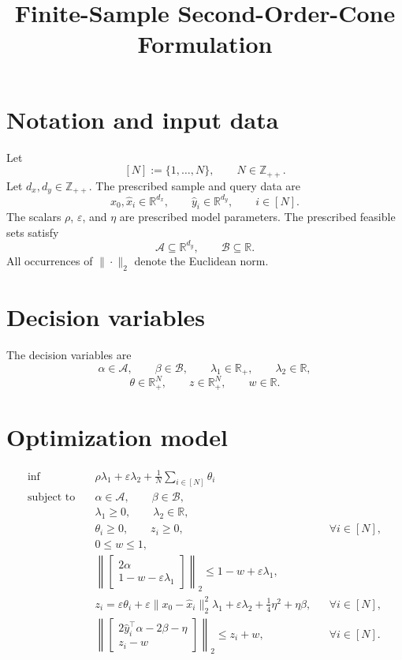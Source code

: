 \documentclass[11pt]{article}
\title{Finite-Sample Second-Order-Cone Formulation}
\author{}
\date{}
\begin{document}
\maketitle

\section*{Notation and input data}
Let
\[
[N] := \{1,\ldots,N\},
\qquad N\in\mathbb{Z}_{++}.
\]
Let $d_x,d_y\in\mathbb{Z}_{++}$. The prescribed sample and query data are
\[
x_0,\widehat{x}_i\in\mathbb{R}^{d_x},
\qquad
\widehat{y}_i\in\mathbb{R}^{d_y},
\qquad i\in[N].
\]
The scalars $\rho$, $\varepsilon$, and $\eta$ are prescribed model parameters. The prescribed feasible sets satisfy
\[
\mathcal{A}\subseteq\mathbb{R}^{d_y},
\qquad
\mathcal{B}\subseteq\mathbb{R}.
\]
All occurrences of $\|\cdot\|_2$ denote the Euclidean norm.

\section*{Decision variables}
The decision variables are
\[
\alpha\in\mathcal{A},
\qquad
\beta\in\mathcal{B},
\qquad
\lambda_1\in\mathbb{R}_+,
\qquad
\lambda_2\in\mathbb{R},
\]
\[
\theta\in\mathbb{R}_+^N,
\qquad
z\in\mathbb{R}_+^N,
\qquad
w\in\mathbb{R}.
\]

\section*{Optimization model}
\begin{align}
\inf\quad
& \rho\lambda_1+\varepsilon\lambda_2
  +\frac{1}{N}\sum_{i\in[N]}\theta_i
\label{eq:objective}\\[0.25em]
\text{subject to}\quad
& \alpha\in\mathcal{A},
  \qquad \beta\in\mathcal{B},
\label{eq:sets}\\
& \lambda_1\ge 0,
  \qquad \lambda_2\in\mathbb{R},
\label{eq:lambda-domains}\\
& \theta_i\ge 0,
  \qquad z_i\ge 0,
  && \forall i\in[N],
\label{eq:vector-domains}\\
& 0\le w\le 1,
\label{eq:w-domain}\\
& \left\|
  \begin{bmatrix}
  2\alpha\\
  1-w-\varepsilon\lambda_1
  \end{bmatrix}
  \right\|_2
  \le 1-w+\varepsilon\lambda_1,
\label{eq:first-soc}\\
& z_i
  =\varepsilon\theta_i
  +\varepsilon\|x_0-\widehat{x}_i\|_2^2\lambda_1
  +\varepsilon\lambda_2
  +\frac{1}{4}\eta^2
  +\eta\beta,
  && \forall i\in[N],
\label{eq:z-definition}\\
& \left\|
  \begin{bmatrix}
  2\widehat{y}_i^{\top}\alpha-2\beta-\eta\\
  z_i-w
  \end{bmatrix}
  \right\|_2
  \le z_i+w,
  && \forall i\in[N].
\label{eq:second-soc}
\end{align}
\end{document}
